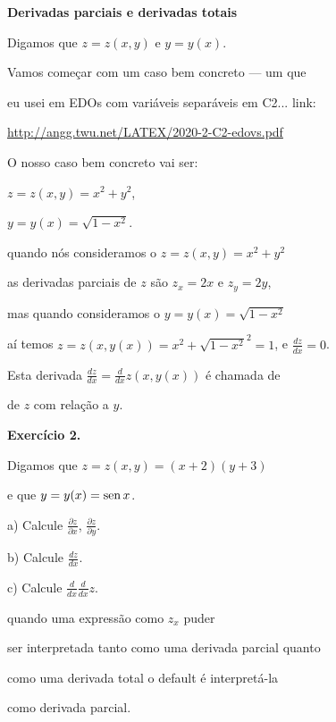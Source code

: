 \documentclass[oneside,12pt]{article}
\begin{document}
\newpage

{\bf Derivadas parciais e derivadas totais}

Digamos que $z = z(x,y)$ e $y = y(x)$.

\msk

Vamos começar com um caso bem concreto --- um que

eu usei em EDOs com variáveis separáveis em C2... link:
\ssk

{\footnotesize

\url{http://angg.twu.net/LATEX/2020-2-C2-edovs.pdf}

}

\msk

O nosso caso bem concreto vai ser:

$z = z(x,y) = x^2 + y^2$,

$y = y(x) = \sqrt{1 - x^2}$.

quando nós  consideramos o $z = z(x,y) = x^2 + y^2$

as derivadas parciais de $z$ são $z_x = 2x$ e $z_y = 2y$,

mas quando  consideramos o $y = y(x) = \sqrt{1 - x^2}$

aí temos $z = z(x,y(x)) = x^2 + \sqrt{1-x^2}^2 = 1$, e $\frac{dz}{dx}=0$.

\msk

Esta derivada $\frac{dz}{dx} = \frac{d}{dx} z(x,y(x))$ é chamada de

 de $z$ com relação a $y$.




\newpage


{\bf Exercício 2.}

Digamos que $z = z(x,y) = (x+2)(y+3)$

e que $y = y(x) = \operatorname{sen} x$.

a) Calcule $\frac{∂z}{∂x}$, $\frac{∂z}{∂y}$.

b) Calcule $\frac{dz}{dx}$.

c) Calcule $\frac{d}{dx}\frac{d}{dx}z$.

\msk

 quando uma expressão como $z_x$ puder

ser interpretada tanto como uma derivada parcial quanto

como uma derivada total o default é interpretá-la

como derivada parcial.
\end{document}
